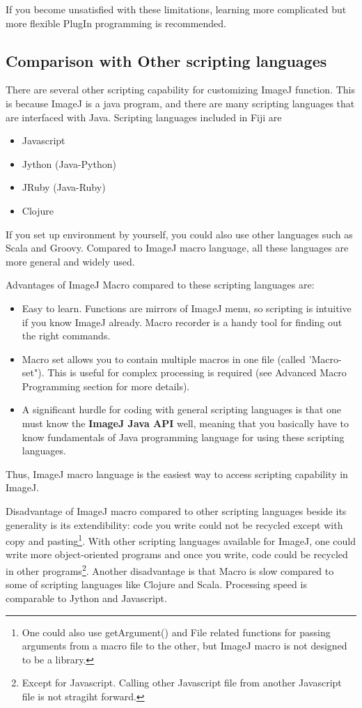 \documentclass[11pt,a4paper,oneside]{report}
\begin{document}
If you become unsatisfied with these limitations, learning more complicated but more flexible PlugIn programming is recommended. 

\subsection{Comparison with Other scripting languages}
There are several other scripting capability for customizing ImageJ function. This is because ImageJ is a java program, and there are many scripting languages that are interfaced with Java. Scripting languages included in Fiji are 

\begin{itemize}
 \item Javascript
 \item Jython (Java-Python)
 \item JRuby (Java-Ruby)
 \item Clojure
 \end{itemize}

If you set up environment by yourself, you could also use other languages such as Scala and Groovy. Compared to ImageJ macro language, all these languages are more general and widely used. 

Advantages of ImageJ Macro compared to these scripting languages are: 
\begin{itemize}
\item Easy to learn. Functions are mirrors of ImageJ menu, so scripting is intuitive if you know ImageJ already. Macro recorder is a handy tool for finding out the right commands. 

\item Macro set allows you to contain multiple macros in one file (called 'Macro-set"). This is useful for complex processing is required (see Advanced Macro Programming section for more details). 

\item A significant hurdle for coding with general scripting languages is that one must know the \textbf{ImageJ Java API} well, meaning that you basically have to know fundamentals of Java programming language for using these scripting languages. 
\end{itemize}

Thus, ImageJ macro language is the easiest way to access scripting capability in ImageJ. 

Disadvantage of ImageJ macro compared to other scripting languages beside its generality is its extendibility: code you write could not be recycled except with copy and pasting\footnote{One could also use getArgument() and File related functions for passing arguments from a macro file to the other, but ImageJ macro is not designed to be a library. }. With other scripting languages available for ImageJ, one could write more object-oriented programs and once you write, code could be recycled in other programs\footnote{ Except for Javascript. Calling other Javascript file from another Javascript file is not stragiht forward.}. Another disadvantage is that Macro is slow compared to some of scripting languages like Clojure and Scala. Processing speed is comparable to Jython and Javascript.  
\end{document}
